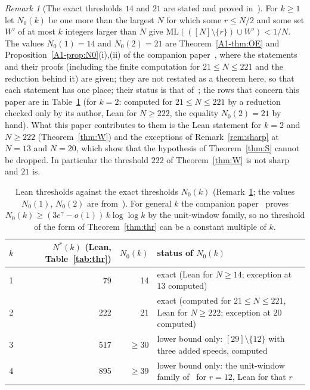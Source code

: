 \documentclass[11pt]{article}
\theoremstyle{definition}
\theoremstyle{remark}
\newtheorem{remark}[theorem]{Remark}
\newcommand{\ML}{\mathrm{ML}}
\newcommand{\xA}[1]{\ref{A1-#1}}
\begin{document}
\begin{remark}[The exact thresholds $14$ and $21$ are stated and proved in~\cite{A1}]\label{rem:Nzero}
For $k\ge1$ let $N_0(k)$ be one more than the largest $N$ for which some $r\le N/2$ and some set $W'$ of at most $k$ integers larger than $N$ give $\ML(([N]\setminus\{r\})\cup W')<1/N$. The values $N_0(1)=14$ and $N_0(2)=21$ are Theorem~\xA{thm:OE} and Proposition~\xA{prop:N0}(i),(ii) of the companion paper~\cite{A1}, where the statements and their proofs (including the finite computation for $21\le N\le221$ and the reduction behind it) are given; they are not restated as a theorem here, so that each statement has one place; their status is that of~\cite[Table~\xA{tab:status}]{A1}; the rows that concern this paper are in Table~\ref{tab:Nzero} (for $k=2$: computed for $21\le N\le221$ by a reduction checked only by its author, Lean for $N\ge222$, the equality $N_0(2)=21$ by hand). What this paper contributes to them is the Lean statement for $k=2$ and $N\ge222$ (Theorem~\ref{thm:W}) and the exceptions of Remark~\ref{rem:sharp} at $N=13$ and $N=20$, which show that the hypothesis of Theorem~\ref{thm:S} cannot be dropped. In particular the threshold $222$ of Theorem~\ref{thm:W} is not sharp and $21$ is.
\end{remark}

\begin{table}[ht]
\centering
\small
\begin{tabular}{r r r p{}}
\toprule
$k$ & $N^*(k)$ (Lean, Table~\ref{tab:thr}) & $N_0(k)$ & status of $N_0(k)$ \\
\midrule
1 & 79 & 14 & exact (Lean for $N\ge14$; exception at $13$ computed) \\
2 & 222 & 21 & exact (computed for $21\le N\le221$, Lean for $N\ge222$; exception at $20$ computed) \\
3 & 517 & $\ge30$ & lower bound only: $[29]\setminus\{12\}$ with three added speeds, computed \\
4 & 895 & $\ge39$ & lower bound only: the unit-window family of~\cite{A1} for $r=12$, Lean for that $r$ \\
\bottomrule
\end{tabular}
\caption{Lean thresholds against the exact thresholds $N_0(k)$ (Remark~\ref{rem:Nzero}; the values $N_0(1)$, $N_0(2)$ are from~\cite{A1}). For general $k$ the companion paper~\cite{A1} proves $N_0(k)\ge(3e^{\gamma}-o(1))\,k\log\log k$ by the unit-window family, so no threshold of the form of Theorem~\ref{thm:thr} can be a constant multiple of $k$.}
\label{tab:Nzero}
\end{table}
\end{document}
